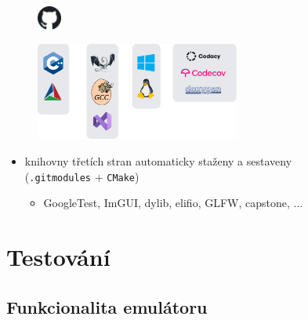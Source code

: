 \documentclass[compress]{beamer}
\begin{document}
\begin{frame}
	\vspace{-0.5cm}
	\begin{figure}
		\centering
		\includegraphics[width=0.07\textwidth]{img/logos/github.pdf}
	\end{figure}
	\centering
	\vspace{-0.4cm}
	\href{https://github.com/silhavyj/ZeroMate}{}
	\vspace{-0.1cm}
	\noindent\makebox[\linewidth]{\rule{\textwidth}{0.4pt}}
	\begin{figure}
		\centering
		\includegraphics[width=0.6\textwidth]{img/logos/logos.pdf}
	\end{figure}
	\vspace{-0.6cm}
	\noindent\makebox[\linewidth]{\rule{\textwidth}{0.4pt}}
	\vspace{-0.3cm}
	\begin{itemize}
		\item knihovny třetích stran automaticky staženy a sestaveny \\ (\texttt{.gitmodules} + \texttt{CMake})
		\begin{itemize}
			\item GoogleTest, ImGUI, dylib, elifio, GLFW, capstone, ... 
		\end{itemize}
	\end{itemize}
\end{frame}

\section{Testování}

\subsection{Funkcionalita emulátoru}
\end{document}
